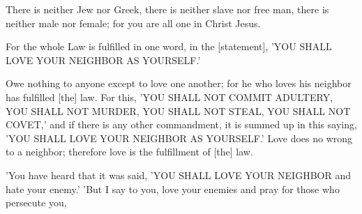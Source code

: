 \begin{scripture}[Galatians 3:28]
    There is neither Jew nor Greek, there is neither slave nor free man, there is neither male nor female; for you are all one in Christ Jesus.
\end{scripture}

\begin{scripture}[Galatians 5:14]
    For the whole Law is fulfilled in one word, in the [statement], 'YOU SHALL LOVE YOUR NEIGHBOR AS YOURSELF.'
\end{scripture}

\begin{scripture}[Romans 13:8-10]
    Owe nothing to anyone except to love one another; for he who loves his neighbor has fulfilled [the] law.
    For this, 'YOU SHALL NOT COMMIT ADULTERY, YOU SHALL NOT MURDER, YOU SHALL NOT STEAL, YOU SHALL NOT COVET,' and if there is any other commandment, it is summed up in this saying, 'YOU SHALL LOVE YOUR NEIGHBOR AS YOURSELF.'
    Love does no wrong to a neighbor; therefore love is the fulfillment of [the] law.
\end{scripture}

\begin{scripture}[Matthew 5:43-44]
    'You have heard that it was said, 'YOU SHALL LOVE YOUR NEIGHBOR and hate your enemy.'
    'But I say to you, love your enemies and pray for those who persecute you,
\end{scripture}
